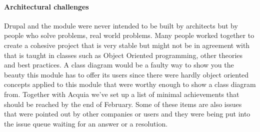 \paragraph{Architectural challenges}
Drupal and the module were never intended to be built by architects but by people who solve problems, real world problems. Many people worked together to create a cohesive project that is very stable but might not be in agreement with that is taught in classes such as Object Oriented programming, other theories and best practices. A class diagram would be a faulty way to show you the beauty this module has to offer its users since there were hardly object oriented concepts applied to this module that were worthy enough to show a class diagram from. Together with Acquia we've set up a list of minimal achievements that should be reached by the end of  February. Some of these items are also issues that were pointed out by other companies or users and they were being put into the issue queue waiting for an answer or a resolution. 

